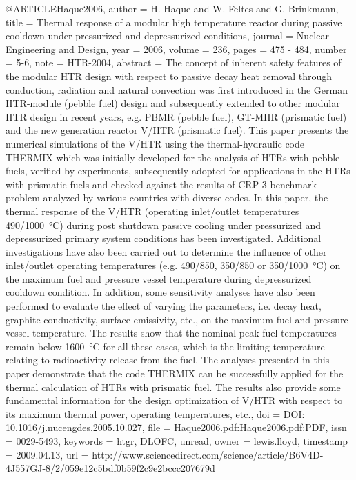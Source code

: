 {@ARTICLE{Haque2006,
  author = {H. Haque and W. Feltes and G. Brinkmann},
  title = {Thermal response of a modular high temperature reactor during passive
	cooldown under pressurized and depressurized conditions},
  journal = {Nuclear Engineering and Design},
  year = {2006},
  volume = {236},
  pages = {475 - 484},
  number = {5-6},
  note = {HTR-2004},
  abstract = {The concept of inherent safety features of the modular HTR design
	with respect to passive decay heat removal through conduction, radiation
	and natural convection was first introduced in the German HTR-module
	(pebble fuel) design and subsequently extended to other modular HTR
	design in recent years, e.g. PBMR (pebble fuel), GT-MHR (prismatic
	fuel) and the new generation reactor V/HTR (prismatic fuel). This
	paper presents the numerical simulations of the V/HTR using the thermal-hydraulic
	code THERMIX which was initially developed for the analysis of HTRs
	with pebble fuels, verified by experiments, subsequently adopted
	for applications in the HTRs with prismatic fuels and checked against
	the results of CRP-3 benchmark problem analyzed by various countries
	with diverse codes. In this paper, the thermal response of the V/HTR
	(operating inlet/outlet temperatures 490/1000 °C) during post shutdown
	passive cooling under pressurized and depressurized primary system
	conditions has been investigated. Additional investigations have
	also been carried out to determine the influence of other inlet/outlet
	operating temperatures (e.g. 490/850, 350/850 or 350/1000 °C) on
	the maximum fuel and pressure vessel temperature during depressurized
	cooldown condition. In addition, some sensitivity analyses have also
	been performed to evaluate the effect of varying the parameters,
	i.e. decay heat, graphite conductivity, surface emissivity, etc.,
	on the maximum fuel and pressure vessel temperature. The results
	show that the nominal peak fuel temperatures remain below 1600 °C
	for all these cases, which is the limiting temperature relating to
	radioactivity release from the fuel. The analyses presented in this
	paper demonstrate that the code THERMIX can be successfully applied
	for the thermal calculation of HTRs with prismatic fuel. The results
	also provide some fundamental information for the design optimization
	of V/HTR with respect to its maximum thermal power, operating temperatures,
	etc.},
  doi = {DOI: 10.1016/j.nucengdes.2005.10.027},
  file = {Haque2006.pdf:Haque2006.pdf:PDF},
  issn = {0029-5493},
  keywords = {htgr, DLOFC, unread},
  owner = {lewis.lloyd},
  timestamp = {2009.04.13},
  url = {http://www.sciencedirect.com/science/article/B6V4D-4J557GJ-8/2/059e12c5bdf0b59f2c9e2bccc207679d}
}

}

